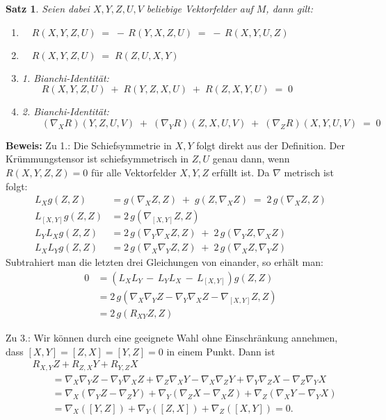 \documentclass[12pt,a4paper]{article}
\newtheorem{Satz}[Lemma]{Satz}
\def\proof{\noindent\textbf{Beweis:}\quad}
\begin{document}
\begin{Satz}
\label{Charakterisierung-der-Kruemmung}
 Seien dabei $X,Y,Z,U,V$ beliebige Vektorfelder auf $M$, dann gilt:
\begin{enumerate}
 \item
$\quad
R(X,Y,Z,U) \;=\; -\, R(Y,X, Z,U) \;=\; -\, R(X,Y,U,Z)
$
 \item
$ \quad
R(X,Y,Z,U) \;=\; R(Z,U,X,Y)
$
\item  1. Bianchi-Identit\"at: \\[1ex]
$ \qquad
R(X,Y,Z,U) \;+\; R(Y,Z,X,U) \;+\; R(Z,X,Y,U) \;=\; 0
$
\item  2. Bianchi-Identit\"at: \\[1ex]
$ \qquad
(\nabla_XR)(Y , Z ,U  ,V ) \;+\; (\nabla_YR)( Z, X , U , V) \;+\; (\nabla_ZR)(X ,Y  ,U  ,V ) \;=\; 0
$
\end{enumerate}
\end{Satz}
\proof
Zu 1.: Die Schiefsymmetrie in $X, Y$ folgt direkt aus der Definition. Der Kr\"ummungstensor ist
schiefsymmetrisch in $Z,U$ genau dann, wenn $R(X,Y,Z,Z)= 0$ f\"ur alle Vektorfelder $X,Y,Z$
erf\"ullt ist.  Da $\nabla$ metrisch ist folgt:
$$
\begin{array}{rl}
L_X g(Z,Z) & = g(\nabla_X Z, Z) \;+\; g(Z, \nabla_XZ) \;=\; 2\, g(\nabla_XZ, Z) \\[1.5ex]
L_{[X,Y]} g(Z,Z)&  = 2 \, g(\nabla_{[X,Y]}Z,Z) \\[1.5ex]
L_YL_X g(Z,Z) & = 2 \, g(\nabla_Y\nabla_XZ, Z) \;+\; 2\,g(\nabla_YZ, \nabla_XZ) \\[1.5ex]
L_XL_Y g(Z,Z) & = 2 \, g(\nabla_X\nabla_YZ, Z) \;+\; 2\,g(\nabla_XZ, \nabla_YZ)
\end{array}
$$
Subtrahiert man die letzten drei Gleichungen von einander, so erh\"alt man:
$$
\begin{array}{rl}
0 & = (L_XL_Y \,-\, L_YL_X \,-\, L_{[X,Y]}) g(Z,Z) \\[1.5ex]
& =
2\,g(\nabla_X \nabla_YZ - \nabla_Y\nabla_X Z - \nabla_{[X,Y]}Z,Z) \\[1.5ex]
& =
2\,g(R_{X Y}Z,Z)
\end{array}
$$

Zu 3.: Wir k\"onnen durch eine geeignete Wahl ohne Einschr\"ankung annehmen, dass
$[X,Y] = [Z,X] = [Y,Z] = 0$ in einem Punkt. Dann ist
\begin{align*}
&R_{X,Y}Z + R_{Z,X}Y + R_{Y,Z}X \\&\qquad= 
\nabla_X\nabla_Y Z - \nabla_Y\nabla_X Z + \nabla_Z\nabla_X Y - \nabla_X\nabla_Z
Y + \nabla_Y\nabla_Z X - \nabla_Z\nabla_Y X\\
&\qquad= \nabla_X(\nabla_Y Z - \nabla_Z Y) + \nabla_Y(\nabla_Z X - \nabla_X Z)
+ \nabla_Z(\nabla_X Y - \nabla_Y X)\\
&\qquad= \nabla_X([Y,Z]) + \nabla_Y([Z,X])
+ \nabla_Z([X,Y]) = 0.
\end{align*}
\end{document}
